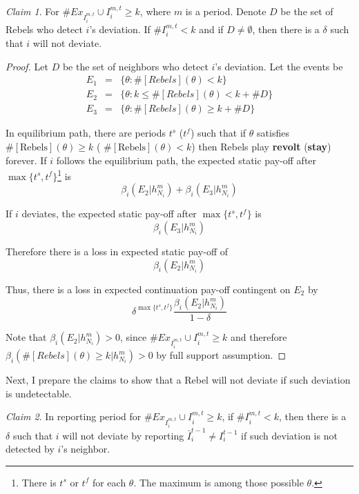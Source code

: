 \documentclass[12pt,letterpaper]{article}
\theoremstyle{definition}
\theoremstyle{remark}
\theoremstyle{claim}
\newtheorem{claim}{Claim}
\begin{document}
\begin{claim} 
\label{claim_detection_reporting_period}
For $\#Ex_{I^{m,t}_i}\cup I^{m,t}_i\geq k$, where $m$ is a period. Denote $D$ be the set of Rebels who detect $i$'s deviation. If $\# I^{m,t}_i<k$ and if $D\neq \emptyset$, then there is a $\delta$ such that $i$ will not deviate.
\end{claim}
\begin{proof}

Let $D$ be the set of neighbors who detect $i$'s deviation. Let the events be
\begin{eqnarray*}
E_1 	&= &\{\theta: \#[Rebels](\theta)< k\}\\
E_2 	&= &\{\theta: k\leq \#[Rebels](\theta)<k+\# D\}\\
E_3 	&= &\{\theta: \#[Rebels](\theta)\geq k+\# D\}
\end{eqnarray*}

In equilibrium path, there are periods $t^{s}$ ($t^{f}$) such that if $\theta$ satisfies $\#[\text{Rebels}](\theta)\geq k$ ( $\#[\text{Rebels}](\theta)< k$) then Rebels play \textbf{revolt} (\textbf{stay}) forever. If $i$ follows the equilibrium path, the expected static pay-off after $\max\{t^s,t^f\}$\footnote{There is $t^{s}$ or $t^{f}$ for each $\theta$. The maximum is among those possible $\theta$.} is
 \[\beta_{i}(E_2|h^{m}_{N_i})+\beta_{i}(E_3|h^{m}_{N_i})\]

If $i$ deviates, the expected static pay-off after $\max\{t^s,t^f\}$ is
 \[\beta_{i}(E_3|h^{m}_{N_i})\]
 
Therefore there is a loss in expected static pay-off of
\[\beta_{i}(E_2|h^{m}_{N_i})\]

Thus, there is a loss in expected continuation pay-off contingent on $E_2$ by
\[\delta^{\max\{t^s,t^f\}}\frac{\beta_{i}(E_2|h^{m}_{N_i})}{1-\delta}\]

Note that $\beta_{i}(E_2|h^{m}_{N_i})>0$, since $\#Ex_{I^{m,t}_i}\cup I^{m,t}_i\geq k$ and therefore $\beta_{i}(\#[Rebels](\theta)\geq k|h^{m}_{N_i})>0$ by full support assumption.
\end{proof}


Next, I prepare the claims to show that a Rebel will not deviate if such deviation is undetectable.

\begin{claim} 
\label{claim_deviation_higher_reporting}
In reporting period for $\# Ex_{I^{m,t}_i}\cup I^{m,t}_i \geq k$, if $\# I^{m,t}_i<k$, then there is a $\delta$ such that $i$ will not deviate by reporting $\bar{I}^{t-1}_i\neq I^{t-1}_i$ if such deviation is not detected by $i$'s neighbor.
\end{claim}
\end{document}
